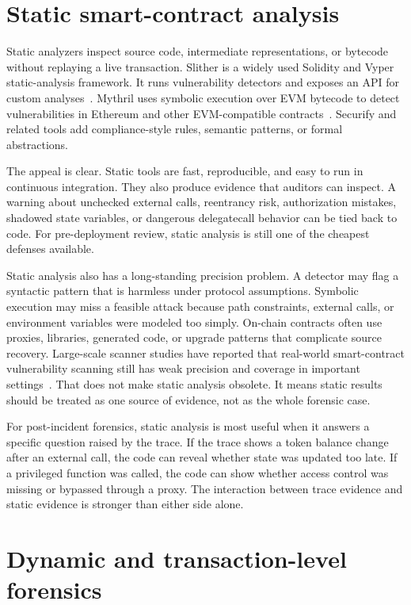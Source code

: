 \documentclass[conference]{IEEEtran}
\begin{document}
\section{Static smart-contract analysis}

Static analyzers inspect source code, intermediate representations, or bytecode without replaying a live transaction. Slither is a widely used Solidity and Vyper static-analysis framework. It runs vulnerability detectors and exposes an API for custom analyses~\cite{slither}. Mythril uses symbolic execution over EVM bytecode to detect vulnerabilities in Ethereum and other EVM-compatible contracts~\cite{mythril}. Securify and related tools add compliance-style rules, semantic patterns, or formal abstractions.

The appeal is clear. Static tools are fast, reproducible, and easy to run in continuous integration. They also produce evidence that auditors can inspect. A warning about unchecked external calls, reentrancy risk, authorization mistakes, shadowed state variables, or dangerous delegatecall behavior can be tied back to code. For pre-deployment review, static analysis is still one of the cheapest defenses available.

Static analysis also has a long-standing precision problem. A detector may flag a syntactic pattern that is harmless under protocol assumptions. Symbolic execution may miss a feasible attack because path constraints, external calls, or environment variables were modeled too simply. On-chain contracts often use proxies, libraries, generated code, or upgrade patterns that complicate source recovery. Large-scale scanner studies have reported that real-world smart-contract vulnerability scanning still has weak precision and coverage in important settings~\cite{largescale_scanners}. That does not make static analysis obsolete. It means static results should be treated as one source of evidence, not as the whole forensic case.

For post-incident forensics, static analysis is most useful when it answers a specific question raised by the trace. If the trace shows a token balance change after an external call, the code can reveal whether state was updated too late. If a privileged function was called, the code can show whether access control was missing or bypassed through a proxy. The interaction between trace evidence and static evidence is stronger than either side alone.

\section{Dynamic and transaction-level forensics}
\end{document}
